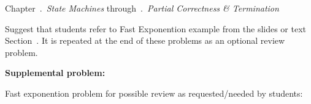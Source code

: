 \documentclass[handout]{mcs}
\begin{document}

\begin{staffnotes}
Chapter~.\ \emph{State Machines}
through~.\ \emph{Partial Correctness \&
  Termination}
\end{staffnotes}


\begin{staffnotes}
Suggest that students refer to Fast Exponention example from the
slides or text Section~.  It is repeated at the
end of these problems as an optional review problem.
\end{staffnotes}





\textbf{Supplemental problem:}


\begin{staffnotes}
Fast exponention problem for possible review as requested/needed by students:


\end{staffnotes}

\end{document}
